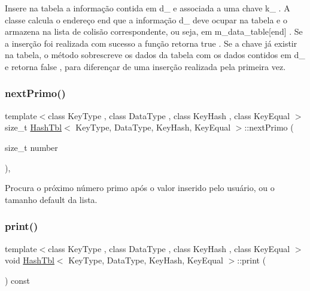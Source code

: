 Insere na tabela a informação contida em d\+\_\+ e associada a uma chave k\+\_\+ . A classe calcula o endereço end que a informação d\+\_\+ deve ocupar na tabela e o armazena na lista de colisão correspondente, ou seja, em m\+\_\+data\+\_\+table\mbox{[}end\mbox{]} . Se a inserção foi realizada com sucesso a função retorna true . Se a chave já existir na tabela, o método sobrescreve os dados da tabela com os dados contidos em d\+\_\+ e retorna false , para diferençar de uma inserção realizada pela primeira vez. \mbox{\label{classHashTbl_aa85eb1e9ae9c838111b71a6ca464e9a5}} 
\subsubsection{\texorpdfstring{next\+Primo()}{nextPrimo()}}
{\footnotesize\ttfamily template$<$class Key\+Type , class Data\+Type , class Key\+Hash , class Key\+Equal $>$ \\
size\+\_\+t \hyperlink{classHashTbl}{Hash\+Tbl}$<$ Key\+Type, Data\+Type, Key\+Hash, Key\+Equal $>$\+::next\+Primo (\begin{DoxyParamCaption}\item[{size\+\_\+t}]{number }\end{DoxyParamCaption})\hspace{0.3cm}{\ttfamily [inline]}, {\ttfamily [private]}}



Procura o próximo número primo após o valor inserido pelo usuário, ou o tamanho default da lista. 

\mbox{\label{classHashTbl_a4b78fa6241832fc1d4d8987df0f4fabe}} 
\subsubsection{\texorpdfstring{print()}{print()}}
{\footnotesize\ttfamily template$<$class Key\+Type , class Data\+Type , class Key\+Hash , class Key\+Equal $>$ \\
void \hyperlink{classHashTbl}{Hash\+Tbl}$<$ Key\+Type, Data\+Type, Key\+Hash, Key\+Equal $>$\+::print (\begin{DoxyParamCaption}{ }\end{DoxyParamCaption}) const\hspace{0.3cm}{\ttfamily [inline]}}

